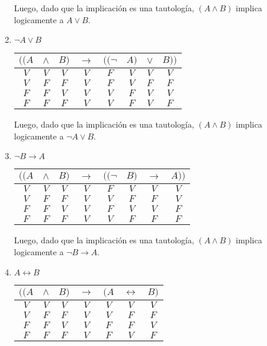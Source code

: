 \documentclass[osajnl,twocolumn,showpacs,superscriptaddress,10pt]{revtex4-1} %
\begin{document}
\begin{enumerate}[i-]
  Luego, dado que la implicación es una tautología, $(A \wedge B)$ implica logicamente a $A \vee B$. \\

  \item $\neg A \vee B$

  \begin{table}[h!]
    \setlength{\tabcolsep}{1.0em}
    \centering
    \begin{tabular}{ccc|c|cccc}
      $((A$ & $\wedge$ & $B)$ & $\rightarrow$ & $((\neg$ & $A)$ & $\vee$ & $B))$ \\
      \hline
      $V$ & $V$ & $V$ & $V$ & $F$ & $V$ & $V$ & $V$ \\
      $V$ & $F$ & $F$ & $V$ & $F$ & $V$ & $F$ & $F$ \\
      $F$ & $F$ & $V$ & $V$ & $V$ & $F$ & $V$ & $V$ \\
      $F$ & $F$ & $F$ & $V$ & $V$ & $F$ & $V$ & $F$
    \end{tabular}
  \end{table}

  Luego, dado que la implicación es una tautología, $(A \wedge B)$ implica logicamente a $\neg A \vee B$. \\

  \item $\neg B \rightarrow A$

  \begin{table}[h!]
    \setlength{\tabcolsep}{1.0em}
    \centering
    \begin{tabular}{ccc|c|cccc}
      $((A$ & $\wedge$ & $B)$ & $\rightarrow$ & $((\neg$ & $B)$ & $\rightarrow$ & $A))$ \\
      \hline
      $V$ & $V$ & $V$ & $V$ & $F$ & $V$ & $V$ & $V$ \\
      $V$ & $F$ & $F$ & $V$ & $V$ & $F$ & $F$ & $V$ \\
      $F$ & $F$ & $V$ & $V$ & $F$ & $V$ & $V$ & $F$ \\
      $F$ & $F$ & $F$ & $V$ & $V$ & $F$ & $F$ & $F$
    \end{tabular}
  \end{table}

  Luego, dado que la implicación es una tautología, $(A \wedge B)$ implica logicamente a $\neg B \rightarrow A$. \\

  \item $A \leftrightarrow B$

  \begin{table}[h!]
    \setlength{\tabcolsep}{1.0em}
    \centering
    \begin{tabular}{ccc|c|ccc}
      $((A$ & $\wedge$ & $B)$ & $\rightarrow$ & $(A$ & $\leftrightarrow$ & $B)$ \\
      \hline
      $V$ & $V$ & $V$ & $V$ & $V$ & $V$ & $V$ \\
      $V$ & $F$ & $F$ & $V$ & $V$ & $F$ & $F$ \\
      $F$ & $F$ & $V$ & $V$ & $F$ & $F$ & $V$ \\
      $F$ & $F$ & $F$ & $V$ & $F$ & $V$ & $F$
    \end{tabular}
  \end{table}


\end{enumerate}
\end{document}
